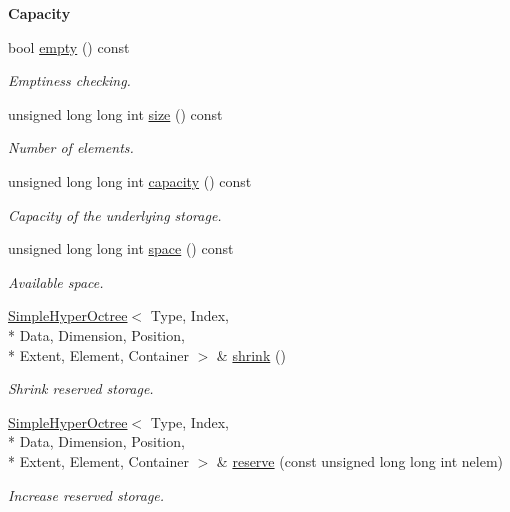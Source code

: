 \begin{Indent}{\bf Capacity}\par
\begin{DoxyCompactItemize}
\item 
bool \hyperlink{exceptionmagrathea_1_1SimpleHyperOctree_a5e81584ceb4d7dbca4a2acbce72bcddb}{empty} () const 
\begin{DoxyCompactList}\small\item\em Emptiness checking. \end{DoxyCompactList}\item 
unsigned long long int \hyperlink{exceptionmagrathea_1_1SimpleHyperOctree_aed410b8f317373c2e19049c7e4044457}{size} () const 
\begin{DoxyCompactList}\small\item\em Number of elements. \end{DoxyCompactList}\item 
unsigned long long int \hyperlink{exceptionmagrathea_1_1SimpleHyperOctree_ae365a47c69ea4874089f28b6dff2e41a}{capacity} () const 
\begin{DoxyCompactList}\small\item\em Capacity of the underlying storage. \end{DoxyCompactList}\item 
unsigned long long int \hyperlink{exceptionmagrathea_1_1SimpleHyperOctree_a915c72d92c4d5b455ae5ddfb60e04b75}{space} () const 
\begin{DoxyCompactList}\small\item\em Available space. \end{DoxyCompactList}\item 
\hyperlink{exceptionmagrathea_1_1SimpleHyperOctree}{Simple\-Hyper\-Octree}$<$ Type, Index, \\*
Data, Dimension, Position, \\*
Extent, Element, Container $>$ \& \hyperlink{exceptionmagrathea_1_1SimpleHyperOctree_a4e7da301e52d9d0b0202a111d4793ea7}{shrink} ()
\begin{DoxyCompactList}\small\item\em Shrink reserved storage. \end{DoxyCompactList}\item 
\hyperlink{exceptionmagrathea_1_1SimpleHyperOctree}{Simple\-Hyper\-Octree}$<$ Type, Index, \\*
Data, Dimension, Position, \\*
Extent, Element, Container $>$ \& \hyperlink{exceptionmagrathea_1_1SimpleHyperOctree_aa18774889493e6ca8abefc387fa6e5fd}{reserve} (const unsigned long long int nelem)
\begin{DoxyCompactList}\small\item\em Increase reserved storage. \end{DoxyCompactList}\end{DoxyCompactItemize}
\end{Indent}
